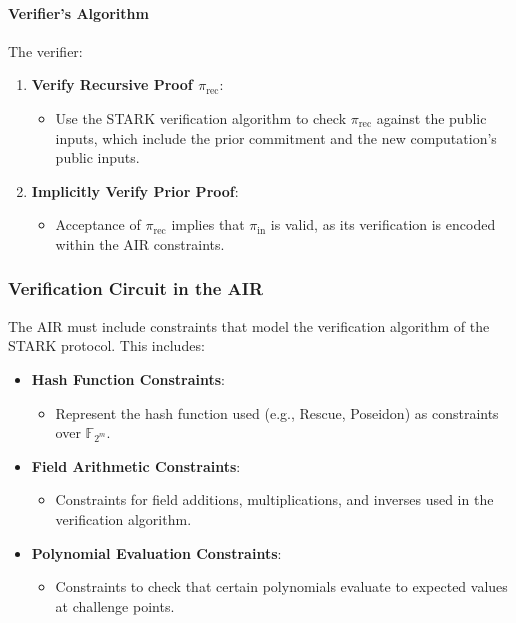 \documentclass{article}
\theoremstyle{plain}
\theoremstyle{definition}
\theoremstyle{remark}
\theoremstyle{problem}
\begin{document}
\paragraph{Verifier's Algorithm}

The verifier:

\begin{enumerate}
    \item \textbf{Verify Recursive Proof $\pi_{\text{rec}}$}:

    \begin{itemize}
        \item Use the STARK verification algorithm to check $\pi_{\text{rec}}$ against the public inputs, which include the prior commitment and the new computation's public inputs.
    \end{itemize}

    \item \textbf{Implicitly Verify Prior Proof}:

    \begin{itemize}
        \item Acceptance of $\pi_{\text{rec}}$ implies that $\pi_{\text{in}}$ is valid, as its verification is encoded within the AIR constraints.
    \end{itemize}
\end{enumerate}

\subsubsection{Verification Circuit in the AIR}

The AIR must include constraints that model the verification algorithm of the STARK protocol. This includes:

\begin{itemize}
    \item \textbf{Hash Function Constraints}:

    \begin{itemize}
        \item Represent the hash function used (e.g., Rescue, Poseidon) as constraints over $\mathbb{F}_{2^m}$.
    \end{itemize}

    \item \textbf{Field Arithmetic Constraints}:

    \begin{itemize}
        \item Constraints for field additions, multiplications, and inverses used in the verification algorithm.
    \end{itemize}

    \item \textbf{Polynomial Evaluation Constraints}:

    \begin{itemize}
        \item Constraints to check that certain polynomials evaluate to expected values at challenge points.
    \end{itemize}
\end{itemize}
\end{document}
